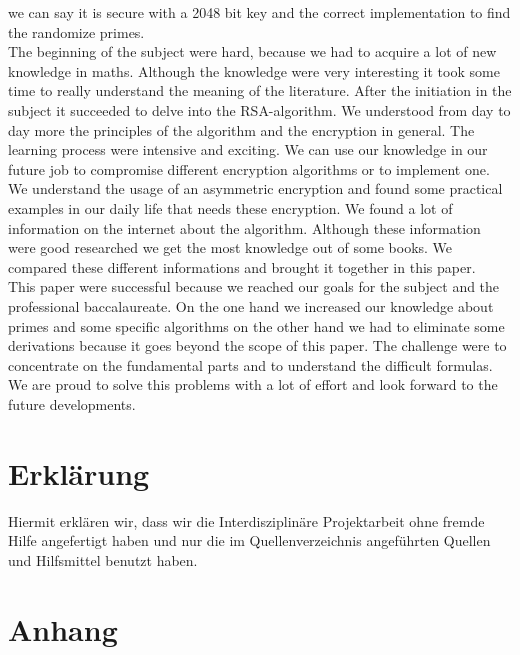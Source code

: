 we can say it is secure with a 2048 bit key and the correct implementation to find the randomize primes. \\
The beginning of the subject were hard, because we had to acquire a lot of new knowledge in maths. Although the knowledge were very interesting it took some time to really understand the meaning of the literature. After the initiation in the subject it succeeded to delve into the RSA-algorithm. %
We understood from day to day more the principles of the algorithm and the encryption in general. The learning process were intensive and exciting. We can use our knowledge in our future job to compromise different encryption algorithms or to implement one. We understand the usage of an asymmetric encryption and found some practical examples in our daily life that needs these encryption.  
We found a lot of information on the internet about the algorithm. Although these information were good researched we get the most knowledge out of some books. We compared these different informations and brought it together in this paper.\\
This paper were successful because we reached our goals for the subject and the professional baccalaureate. On the one hand we increased our knowledge about primes and some specific algorithms on the other hand we had to eliminate some derivations  %
because it goes beyond the scope of this paper. The challenge were to concentrate on the fundamental parts and to understand the difficult formulas. We are proud to solve this problems with a lot of effort and look forward to the future developments. 
\newpage
\section{Erklärung}
Hiermit erklären wir, dass wir die Interdisziplinäre Projektarbeit ohne fremde Hilfe angefertigt haben und nur die im Quellenverzeichnis angeführten Quellen und Hilfsmittel benutzt haben.
\newpage
\section{Anhang}
\listoffigures
\listoftables
%


